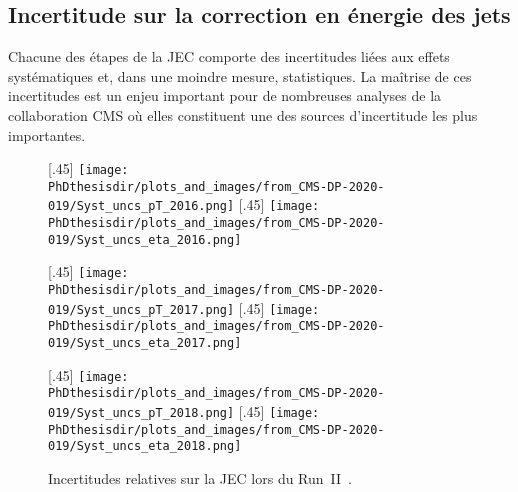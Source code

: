 \subsection{Incertitude sur la correction en énergie des jets}\label{chapter-JERC-section-CMS-subsec-unc}
Chacune des étapes de la JEC comporte des incertitudes liées aux effets systématiques et, dans une moindre mesure, statistiques.
La maîtrise de ces incertitudes est un enjeu important pour de nombreuses analyses de la collaboration CMS où elles constituent une des sources d'incertitude les plus importantes.
\begin{figure}[p]
\centering
{}[.45\textwidth]
{\texttt{[image: \\PhDthesisdir/plots\_and\_images/from\_CMS-DP-2020-019/Syst\_uncs\_pT\_2016.png]}\vspace{-.5\baselineskip}}
\hfill
{}[.45\textwidth]
{\texttt{[image: \\PhDthesisdir/plots\_and\_images/from\_CMS-DP-2020-019/Syst\_uncs\_eta\_2016.png]}\vspace{-.5\baselineskip}}

\vspace{.75\baselineskip}

[.45\textwidth]
{\texttt{[image: \\PhDthesisdir/plots\_and\_images/from\_CMS-DP-2020-019/Syst\_uncs\_pT\_2017.png]}\vspace{-.5\baselineskip}}
\hfill
{}[.45\textwidth]
{\texttt{[image: \\PhDthesisdir/plots\_and\_images/from\_CMS-DP-2020-019/Syst\_uncs\_eta\_2017.png]}\vspace{-.5\baselineskip}}

\vspace{.75\baselineskip}

[.45\textwidth]
{\texttt{[image: \\PhDthesisdir/plots\_and\_images/from\_CMS-DP-2020-019/Syst\_uncs\_pT\_2018.png]}\vspace{-.5\baselineskip}}
\hfill
{}[.45\textwidth]
{\texttt{[image: \\PhDthesisdir/plots\_and\_images/from\_CMS-DP-2020-019/Syst\_uncs\_eta\_2018.png]}\vspace{-.5\baselineskip}}

\caption[Incertitudes relatives sur la JEC en fonction de \pT\ et $\eta$ lors du Run~II.]{Incertitudes relatives sur la JEC lors du Run~II~\cite{CMS-DP-2020-019}.}
\label{fig-Syst_uncs_JEC_RunII}
\end{figure}
